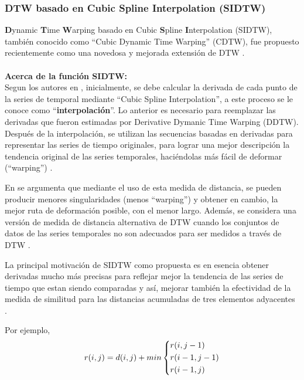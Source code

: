 \subsubsection{\textbf{DTW basado en Cubic Spline Interpolation (SIDTW)}}
\textbf{D}ynamic \textbf{T}ime \textbf{W}arping basado en Cubic \textbf{S}pline \textbf{I}nterpolation (SIDTW), tambi\'en conocido como \enquote{Cubic Dynamic Time Warping} (CDTW),  fue propuesto recientemente como una novedosa y mejorada extensi\'on de DTW \cite{DTWcubicsplineinterpolation}.\\\\
\textbf{Acerca de la funci\'on SIDTW:}\\
Segun los autores en \cite{DTWcubicsplineinterpolation}, inicialmente, se debe calcular la derivada de cada punto de la series de temporal mediante \enquote{Cubic Spline Interpolation}, a este proceso se le conoce como \enquote{\textbf{interpolaci\'on}}. Lo anterior es necesario para reemplazar las derivadas que fueron estimadas por Derivative Dymanic Time Warping (DDTW). Despu\'es de la interpolaci\'on, se utilizan las secuencias basadas en derivadas para representar las series de tiempo originales, para lograr una mejor descripci\'on la tendencia original de las series temporales, haci\'endolas m\'as f\'acil de deformar (\enquote{warping}) \cite{DTWcubicsplineinterpolation}.\par
En \cite{DTWcubicsplineinterpolation} se argumenta que mediante el uso de esta medida de distancia, se pueden producir menores singularidades (menos \enquote{warping}) y obtener en cambio, la mejor ruta de deformaci\'on posible, con el menor largo. Adem\'as, se considera una versi\'on de medida de distancia alternativa de DTW cuando los conjuntos de datos de las series temporales no son adecuados para ser medidos a trav\'es de DTW \cite{DTWcubicsplineinterpolation}.\par
La principal motivaci\'on de SIDTW como propuesta es en esencia obtener derivadas mucho m\'as precisas para reflejar mejor la tendencia de las series de tiempo que estan siendo comparadas y as\'i, mejorar tambi\'en la efectividad de la medida de similitud para las distancias acumuladas de tres elementos adyacentes \cite{DTWcubicsplineinterpolation}.\par
Por ejemplo,
\[
	{r(i,j) = d(i,j) + min}
\begin{dcases}
    {r(i,j - 1)}	\\
    {r(i - 1,j - 1)}\\
    {r(i - 1,j)}    \\
\end{dcases}
\]
